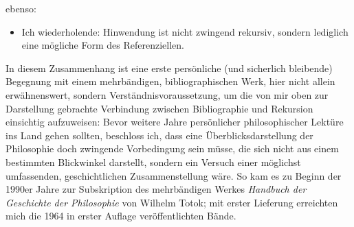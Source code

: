 \documentclass[a4paper,
fontsize=11pt,
oneside,
numbers=noperiodatend,
parskip=half-,
bibliography=totoc,
final
]{scrartcl}
\providecommand{\tightlist}{%
  \setlength{\itemsep}{0pt}\setlength{\parskip}{0pt}}
\begin{document}
ebenso:

\begin{itemize}
\tightlist
\item
  Ich wiederholende: Hinwendung ist nicht zwingend rekursiv, sondern
  lediglich eine mögliche Form des Referenziellen.
\end{itemize}

In diesem Zusammenhang ist eine erste persönliche (und sicherlich
bleibende) Begegnung mit einem mehrbändigen, bibliographischen Werk,
hier nicht allein erwähnenswert, sondern Verständnisvoraussetzung, um
die von mir oben zur Darstellung gebrachte Verbindung zwischen
Bibliographie und Rekursion einsichtig aufzuweisen: Bevor weitere Jahre
persönlicher philosophischer Lektüre ins Land gehen sollten, beschloss
ich, dass eine Überblicksdarstellung der Philosophie doch zwingende
Vorbedingung sein müsse, die sich nicht aus einem bestimmten Blickwinkel
darstellt, sondern ein Versuch einer möglichst umfassenden,
geschichtlichen Zusammenstellung wäre. So kam es zu Beginn der 1990er
Jahre zur Subskription des mehrbändigen Werkes \emph{Handbuch der
Geschichte der Philosophie} von Wilhelm Totok; mit erster Lieferung
erreichten mich die 1964 in erster Auflage veröffentlichten Bände.
\end{document}
